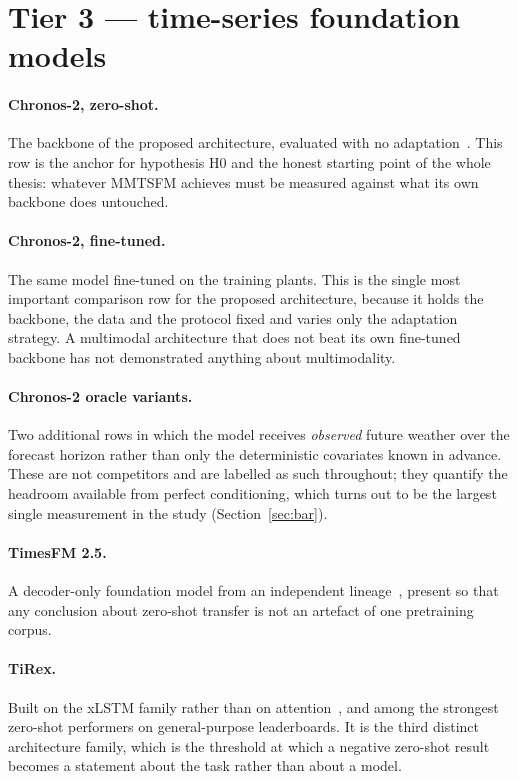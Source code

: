 \section{Tier 3 --- time-series foundation models}
\label{sec:tier3}

\paragraph{Chronos-2, zero-shot.} The backbone of the proposed architecture, evaluated with
no adaptation~\cite{chronos2}. This row is the anchor for hypothesis H0 and the honest
starting point of the whole thesis: whatever MMTSFM achieves must be measured against what
its own backbone does untouched.

\paragraph{Chronos-2, fine-tuned.} The same model fine-tuned on the training plants. This is
the single most important comparison row for the proposed architecture, because it holds the
backbone, the data and the protocol fixed and varies only the adaptation strategy. A
multimodal architecture that does not beat its own fine-tuned backbone has not demonstrated
anything about multimodality.

\paragraph{Chronos-2 oracle variants.} Two additional rows in which the model receives
\emph{observed} future weather over the forecast horizon rather than only the deterministic
covariates known in advance. These are not competitors and are labelled as such throughout;
they quantify the headroom available from perfect conditioning, which turns out to be the
largest single measurement in the study (Section~\ref{sec:bar}).

\paragraph{TimesFM 2.5.} A decoder-only foundation model from an independent
lineage~\cite{timesfm}, present so that any conclusion about zero-shot transfer is not an
artefact of one pretraining corpus.

\paragraph{TiRex.} Built on the xLSTM family rather than on attention~\cite{tirex}, and among
the strongest zero-shot performers on general-purpose leaderboards. It is the third distinct
architecture family, which is the threshold at which a negative zero-shot result becomes a
statement about the task rather than about a model.

